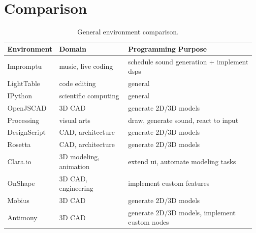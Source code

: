 \section{Comparison}


\begin{table}
	\centering
	\renewcommand{\arraystretch}{1.2}

	\begin{tabulary}{\textwidth}{lLL}
		\toprule
		{\bf Environment}	& {\bf Domain} 						& {\bf Programming Purpose}												\\
		\midrule
		Impromptu			& music, live coding			& schedule sound generation + implement \glspl{dsp}	\\
		LightTable		& code editing						& general																					\\
		IPython				& scientific computing		& general																					\\
		OpenJSCAD			& 3D CAD									& generate 2D/3D models														\\
		Processing		& visual arts							& draw, generate sound, react to input						\\
		DesignScript	& CAD, architecture				& generate 2D/3D models														\\
		Rosetta				& CAD, architecture				& generate 2D/3D models														\\
		Clara.io			& 3D modeling, animation	& extend \gls{ui}, automate modeling tasks				\\
		OnShape				& 3D CAD, engineering			& implement custom features												\\
		Mobius				& 3D CAD									& generate 2D/3D models														\\
		Antimony			& 3D CAD									& generate 2D/3D models, implement custom nodes		\\
	\bottomrule
	\end{tabulary}

	\caption{General environment comparison.}
	\label{table:general:comp}
\end{table}


